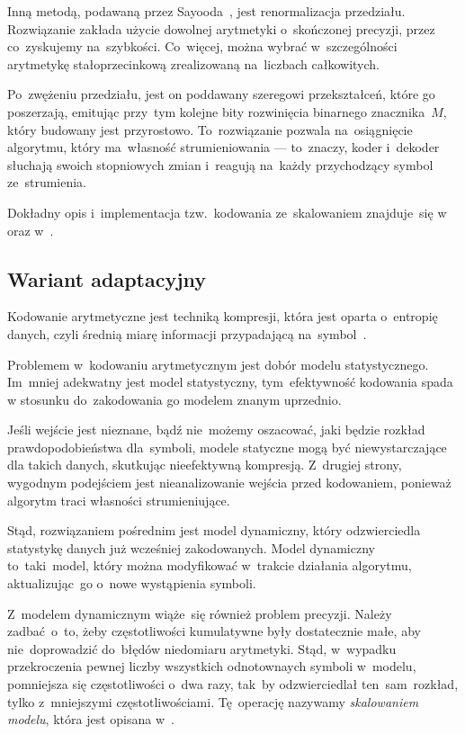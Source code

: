 \documentclass[../../praca.tex]{subfiles}
\begin{document}
Inną metodą, podawaną przez Sayooda~\cite{Sayood:IDC}, jest renormalizacja przedziału.
Rozwiązanie zakłada użycie dowolnej arytmetyki o~skończonej precyzji, przez 
co~zyskujemy na~szybkości. Co~więcej, można wybrać w~szczególności arytmetykę stałoprzecinkową zrealizowaną 
na~liczbach całkowitych. 

Po~zwężeniu przedziału, jest on poddawany
szeregowi przekształceń, które go poszerzają, emitując przy~tym kolejne bity
rozwinięcia binarnego znacznika~\( M \), który budowany jest przyrostowo.
To~rozwiązanie pozwala na~osiągnięcie algorytmu, który ma~własność strumieniowania
--- to~znaczy, koder i~dekoder słuchają swoich stopniowych zmian i~reagują na~każdy
przychodzący symbol ze~strumienia. 

Dokładny opis i~implementacja tzw.~kodowania ze~skalowaniem znajduje~się 
w~\cite{Sayood:IDC} oraz w~\cite{Witten:AC}.

\subsection{Wariant adaptacyjny}

Kodowanie arytmetyczne jest techniką kompresji, która jest oparta o~entropię danych,
czyli średnią miarę informacji przypadającą na~symbol~\cite{Sayood:IDC}. 

Problemem w~kodowaniu arytmetycznym jest dobór modelu statystycznego. 
Im~mniej adekwatny jest model statystyczny, tym~efektywność kodowania
spada w stosunku do~zakodowania go modelem znanym uprzednio. 

Jeśli wejście jest nieznane, bądź nie~możemy oszacować, jaki
będzie rozkład prawdopodobieństwa dla~symboli, modele statyczne
mogą być niewystarczające dla takich danych, skutkując nieefektywną kompresją.
Z~drugiej strony, wygodnym podejściem jest nieanalizowanie wejścia 
przed kodowaniem, ponieważ
algorytm traci własności strumieniujące.

Stąd, rozwiązaniem pośrednim jest model dynamiczny, który odzwierciedla 
statystykę danych już wcześniej zakodowanych. Model dynamiczny to~taki~model,
który można modyfikować w~trakcie działania algorytmu, aktualizując~go
o~nowe wystąpienia symboli. 

Z~modelem dynamicznym wiąże~się również problem precyzji. Należy zadbać~o~to, 
żeby częstotliwości kumulatywne były dostatecznie małe, aby
nie~doprowadzić do~błędów niedomiaru arytmetyki. Stąd, w~wypadku
przekroczenia pewnej liczby wszystkich odnotownaych symboli w~modelu,
pomniejsza się częstotliwości o~dwa razy, tak~by odzwierciedlał 
ten~sam~rozkład, tylko z~mniejszymi częstotliwościami. Tę~operację
nazywamy \emph{skalowaniem modelu}, która jest opisana w~\cite{Witten:AC}.
\end{document}
